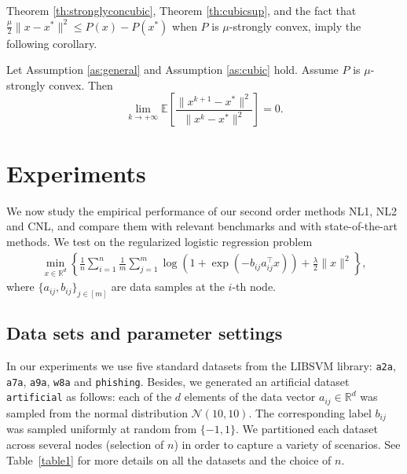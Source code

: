 \documentclass[12pt]{article}
\newcommand{\squeeze}{}
\newcommand{\R}{\mathbb{R}}
\begin{document}
Theorem \ref{th:stronglyconcubic}, Theorem \ref{th:cubicsup}, and the fact that $\frac{\mu}{2} \|x-x^*\|^2 \leq P(x) - P(x^*)$ when $P$ is $\mu$-strongly convex, imply the following corollary. 

\begin{corollary}\label{co:supcubic}
	Let Assumption \ref{as:general} and Assumption \ref{as:cubic} hold. Assume $P$ is $\mu$-strongly convex. Then 
	$$
	\lim\limits_{k\to +\infty} \mathbb{E} \left[  \frac{\|x^{k+1} - x^*\|^2}{\|x^k - x^*\|^2 }  \right] =0. 
	$$
\end{corollary}








\section{Experiments}
\label{sec:experiments}



We now study the empirical performance of our second order methods {\sf NL1}, {\sf NL2} and {\sf CNL}, and compare them with relevant benchmarks and with state-of-the-art methods. We  test on  the regularized logistic regression problem
\begin{eqnarray*}\squeeze
	\min\limits_{x\in\R^d}\left\{\frac{1}{n}\sum\limits_{i=1}^n\frac{1}{m}\sum\limits_{j=1}^m\log\left(1+\exp(-b_{ij}a_{ij}^\top x)\right) + \frac{\lambda}{2}\|x\|^2\right\},
\end{eqnarray*}
where $\{a_{ij}, b_{ij}\}_{j\in[m]}$ are data samples at the $i$-th node. 







\subsection{Data sets and parameter settings} 

In our experiments we use five standard datasets from the LIBSVM library:  {\tt a2a}, {\tt a7a}, {\tt a9a},  {\tt w8a} and {\tt phishing}. Besides, we generated an artificial dataset {\tt artificial} as follows: each of the $d$ elements of the data vector $a_{ij}\in \R^d$ was sampled from the normal distribution $\mathcal{N} (10, 10).$ The corresponding label $b_{ij}$ was sampled uniformly at random from $\{-1, 1\}$. We partitioned each dataset across several nodes (selection of $n$)  in order to capture a variety of scenarios. See Table~\ref{table1} for more details on all the datasets and the choice of $n$. 
\end{document}

